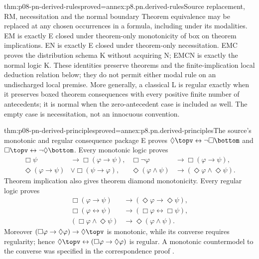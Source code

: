 \begin{hbtheorem}{thm:p08-pn-derived-rules}{proved=annex:p8.pn.derived-rules}{Source replacement, RM, necessitation and the normal boundary}
Theorem equivalence may be replaced at any chosen occurrences in a
formula, including under its modalities. EM is exactly E closed
under theorem-only monotonicity of box on theorem implications.
EN is exactly E closed under theorem-only necessitation.
EMC proves the distribution schema K without acquiring N;
EMCN is exactly the normal logic K. These identities preserve
theorems and the finite-implication local deduction relation below;
they do not permit either modal rule on an undischarged local premise.
More generally, a classical L is regular exactly when it preserves
boxed theorem consequences with every positive finite number of
antecedents; it is normal when the zero-antecedent case is included
as well. The empty case is necessitation, not an innocuous convention.
\end{hbtheorem}

\begin{hbtheorem}{thm:p08-pn-derived-principles}{proved=annex:p8.pn.derived-principles}{The source's monotonic and regular consequence package}
E proves \(\Diamond\topv\leftrightarrow\neg\Box\bottom\)
and \(\Box\topv\leftrightarrow\neg\Diamond\bottom\).
Every monotonic logic proves
\[
\begin{aligned}
 \Box\psi&\to\Box(\varphi\to\psi),&
 \Box\neg\varphi&\to\Box(\varphi\to\psi),\\
 \Diamond(\varphi\to\psi)&\lor\Box(\psi\to\varphi),&
 \Diamond(\varphi\land\psi)&\to(\Diamond\varphi\land\Diamond\psi).
\end{aligned}
\]
Theorem implication also gives theorem diamond monotonicity.
Every regular logic proves
\[
\begin{aligned}
 \Box(\varphi\to\psi)&\to(\Diamond\varphi\to\Diamond\psi),\\
 \Box(\varphi\leftrightarrow\psi)&\to(\Box\varphi\leftrightarrow\Box\psi),\\
 (\Box\varphi\land\Diamond\psi)&\to\Diamond(\varphi\land\psi).
\end{aligned}
\]
Moreover \((\Box\varphi\to\Diamond\varphi)\to\Diamond\topv\)
is monotonic, while its converse requires regularity; hence
\(\Diamond\topv\leftrightarrow(\Box\varphi\to\Diamond\varphi)\)
is regular. A monotonic countermodel to the converse was specified
in the correspondence proof \cite[ex.~2.17]{Pacuit2017}.
\end{hbtheorem}

